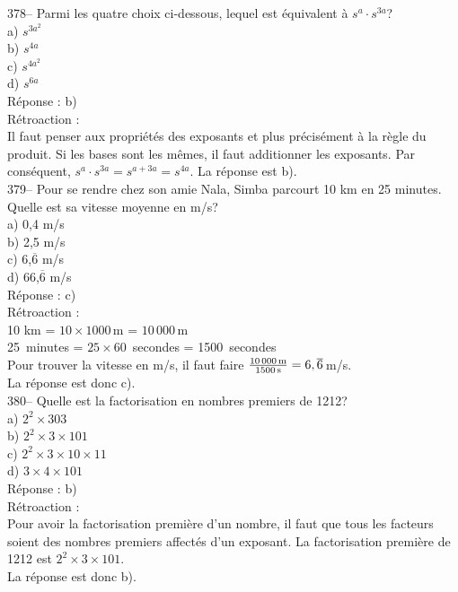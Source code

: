 ﻿\documentclass[letterpaper, 12pt]{article}
\begin{document}
378-- Parmi les quatre choix ci-dessous, lequel est \'equivalent \`a
$s^{a}\cdot s^{3a}$?\\
a) $s^{3a^{2}}$\\
b) $s^{4a}$\\
c) $s^{4a^{2}}$\\
d) $s^{6a}$\\

R\'eponse : b)\\

R\'etroaction : \\
Il faut penser aux propri\'et\'es des exposants et plus pr\'ecis\'ement \`a
la r\`egle du produit.  Si les bases sont les m\^emes, il faut additionner
les exposants.  Par cons\'equent, $s^{a}\cdot s^{3a}=s^{a+3a}=s^{4a}$. La
r\'eponse est b).\\

379-- Pour se rendre chez son amie Nala, Simba parcourt 10 km en 25 minutes.
  Quelle est sa vitesse moyenne en m/s?\\
a) 0,4 m/s\\
b) 2,5 m/s\\
c) 6,$\overline{6}$ m/s\\
d) 66,$\overline{6}$ m/s\\

R\'eponse : c)\\

R\'etroaction : \\
10 km = $10\times1000$\,m = $10\,000$\,m\\
25~minutes = $25\times60$~secondes = 1500~secondes\\
Pour trouver la vitesse en m/s, il faut faire
$\frac{10\,000\textrm{\,m}}{1500\textrm{\,s}}=6,\overline{6}$\,m/s.\\
La r\'eponse est donc c).\\

380-- Quelle est la factorisation en nombres premiers de 1212?\\
a) $2^{2}\times303$\\
b) $2^{2}\times3\times101$\\
c) $2^{2}\times3\times10\times11$\\
d) $3\times4\times101$\\


R\'eponse : b)\\

R\'etroaction : \\
Pour avoir la factorisation premi\`ere d'un nombre, il faut que tous les
facteurs soient des nombres premiers affect\'es d'un exposant.  La
factorisation premi\`ere de 1212 est $2^{2}\times3\times101$.\\  La
r\'eponse est donc b).\\
\end{document}

